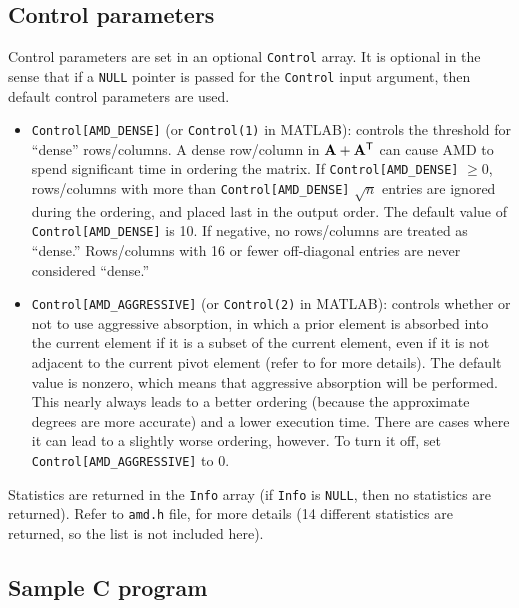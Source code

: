 \documentclass[11pt]{article}
\newcommand{\m}[1]{{\bf{#1}}}       %
\newcommand{\tr}{^{\sf T}}          %
\begin{document}
\subsection{Control parameters}
\label{control_param}

Control parameters are set in an optional {\tt Control} array.
It is optional in the sense that if
a {\tt NULL} pointer is passed for the {\tt Control} input argument,
then default control parameters are used.
%
\begin{itemize}
\item {\tt Control[AMD\_DENSE]} (or {\tt Control(1)} in MATLAB):
controls the threshold for ``dense''
rows/columns.  A dense row/column in $\m{A}+\m{A}\tr$
can cause AMD to spend significant time
in ordering the matrix.  If {\tt Control[AMD\_DENSE]} $\ge 0$,
rows/columns with
more than {\tt Control[AMD\_DENSE]} $\sqrt{n}$ entries are ignored during
the ordering, and placed last in the output order.  The default
value of {\tt Control[AMD\_DENSE]} is 10.  If negative, no rows/columns
are treated as ``dense.''  Rows/columns with 16 or fewer off-diagonal
entries are never considered ``dense.''
%
\item {\tt Control[AMD\_AGGRESSIVE]} (or {\tt Control(2)} in MATLAB):
controls whether or not to use
aggressive absorption, in which a prior element is absorbed into the current
element if it is a subset of the current element, even if it is not
adjacent to the current pivot element (refer
to \cite{AmestoyDavisDuff96,AmestoyDavisDuff04}
for more details).  The default value is nonzero,
which means that aggressive absorption will be performed.  This nearly always
leads to a better ordering (because the approximate degrees are more
accurate) and a lower execution time.  There are cases where it can
lead to a slightly worse ordering, however.  To turn it off, set
{\tt Control[AMD\_AGGRESSIVE]} to 0.
%
\end{itemize}

Statistics are returned in the {\tt Info} array
(if {\tt Info} is {\tt NULL}, then no statistics are returned).
Refer to {\tt amd.h} file, for more details
(14 different statistics are returned, so the list is not included here).

\subsection{Sample C program}
\end{document}
